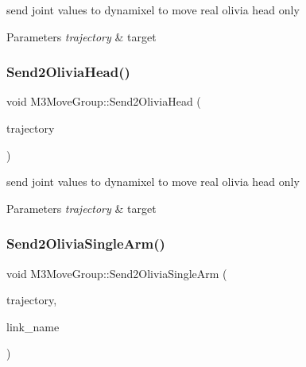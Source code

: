 send joint values to dynamixel to move real olivia head only 


\begin{DoxyParams}{Parameters}
{\em trajectory} & target \\
\hline
\end{DoxyParams}
\mbox{\label{classM3MoveGroup_a5f4c7d0260a2d987e5abaf1b1365c657}} 
\subsubsection{\texorpdfstring{Send2\+Olivia\+Head()}{Send2OliviaHead()}\hspace{0.1cm}{\footnotesize\ttfamily [2/2]}}
{\footnotesize\ttfamily void M3\+Move\+Group\+::\+Send2\+Olivia\+Head (\begin{DoxyParamCaption}\item[{moveit\+\_\+msgs\+::\+Robot\+Trajectory}]{trajectory }\end{DoxyParamCaption})\hspace{0.3cm}{\ttfamily [inline]}}



send joint values to dynamixel to move real olivia head only 


\begin{DoxyParams}{Parameters}
{\em trajectory} & target \\
\hline
\end{DoxyParams}
\mbox{\label{classM3MoveGroup_a0b0b4680d729b8878a89ba03c6d59303}} 
\subsubsection{\texorpdfstring{Send2\+Olivia\+Single\+Arm()}{Send2OliviaSingleArm()}\hspace{0.1cm}{\footnotesize\ttfamily [1/2]}}
{\footnotesize\ttfamily void M3\+Move\+Group\+::\+Send2\+Olivia\+Single\+Arm (\begin{DoxyParamCaption}\item[{moveit\+\_\+msgs\+::\+Robot\+Trajectory}]{trajectory,  }\item[{std\+::string}]{link\+\_\+name }\end{DoxyParamCaption})\hspace{0.3cm}{\ttfamily [inline]}}



